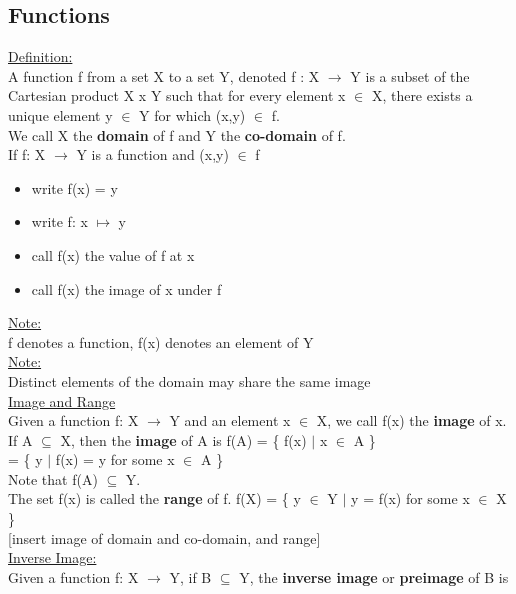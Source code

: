 \documentclass{article}
\begin{document}
\subsection{Functions}

\underline{Definition:} \\
A function f from a set X to a set Y, denoted f : X $\longrightarrow$ Y is a subset of the Cartesian product X x Y such that for every element x $\in$ X, there exists a unique element y $\in$ Y for which (x,y) $\in$ f. \\

We call X the \textbf{domain} of f and Y the \textbf{co-domain} of f. \\

If f: X $\longrightarrow$ Y is a function and (x,y) $\in$ f 
\begin{itemize}
\item write f(x) = y
\item write f: x $\longmapsto$ y 
\item call f(x) the value of f at x 
\item call f(x) the image of x under f 
\end{itemize}

\underline{Note:} \\
f denotes a function, f(x) denotes an element of Y \\

\underline{Note:} \\
Distinct elements of the domain may share the same image \\

\underline{Image and Range} \\
Given a function f: X $\longrightarrow$ Y and an element x $\in$ X, we call f(x) the \textbf{image} of x. If A $\subseteq$ X, then the \textbf{image} of A is f(A) = \{ f(x) $|$ x $\in$ A \} \\
= \{ y $|$ f(x) = y for some x $\in$ A \} \\

Note that f(A) $\subseteq$ Y. \\

The set f(x) is called the \textbf{range} of f. f(X) = \{ y $\in$ Y $|$ y = f(x) for some x $\in$ X \} \\

[insert image of domain and co-domain, and range] \\

\underline{Inverse Image:}\\
Given a function f: X $\longrightarrow$ Y, if B $\subseteq$ Y, the \textbf{inverse image} or \textbf{preimage} of B is
\end{document}
